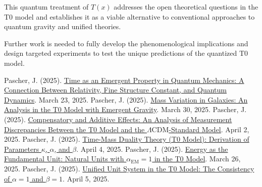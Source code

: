 \documentclass[12pt,a4paper]{article}
\newcommand{\Tfield}{T(x)}
\newcommand{\alphaEM}{\alpha_{\text{EM}}}
\newcommand{\LCDM}{\Lambda\text{CDM}}
\begin{document}
	This quantum treatment of $\Tfield$ addresses the open theoretical questions in the T0 model and establishes it as a viable alternative to conventional approaches to quantum gravity and unified theories.
	
	Further work is needed to fully develop the phenomenological implications and design targeted experiments to test the unique predictions of the quantized T0 model.
	

	
	\begin{thebibliography}{99}
		 Pascher, J. (2025). \href{https://github.com/jpascher/T0-Time-Mass-Duality/tree/main/2/pdf/Deutsch/Zeit\%20als\%20emergente\%20Eigenschaft\%20in\%20der\%20Quantenmechanik_en.pdf}{Time as an Emergent Property in Quantum Mechanics: A Connection Between Relativity, Fine Structure Constant, and Quantum Dynamics}. March 23, 2025.
		 Pascher, J. (2025). \href{https://github.com/jpascher/T0-Time-Mass-Duality/tree/main/2/pdf/Deutsch/Massenvariation\%20in\%20Galaxien_en.pdf}{Mass Variation in Galaxies: An Analysis in the T0 Model with Emergent Gravity}. March 30, 2025.
		 Pascher, J. (2025). \href{https://github.com/jpascher/T0-Time-Mass-Duality/tree/main/2/pdf/Deutsch/Analyse\%20der\%20Messdifferenzen\%20zwischen\%20dem\%20T0-Modell\%20und\%20dem\%20Standardmodell_en.pdf}{Compensatory and Additive Effects: An Analysis of Measurement Discrepancies Between the T0 Model and the \(\LCDM\)-Standard Model}. April 2, 2025.
		 Pascher, J. (2025). \href{https://github.com/jpascher/T0-Time-Mass-Duality/tree/main/2/pdf/Deutsch/Zeit-Masse-Dualit\%C3\%A4tstheorie\%20(T0-Modell)\%20Herleitung\%20der\%20Parameter\%20kappa,\%20alpha\%20und\%20beta_en.pdf}{Time-Mass Duality Theory (T0 Model): Derivation of Parameters \(\kappa\), \(\alpha\), and \(\beta\)}. April 4, 2025.
		 Pascher, J. (2025). \href{https://github.com/jpascher/T0-Time-Mass-Duality/tree/main/2/pdf/Deutsch/Nat\%C3\%BCrliche\%20Einheiten\%20mit\%20Feinstrukturkonstante\%20alpha\%20=\%201_en.pdf}{Energy as the Fundamental Unit: Natural Units with \(\alphaEM = 1\) in the T0 Model}. March 26, 2025.
		 Pascher, J. (2025). \href{https://github.com/jpascher/T0-Time-Mass-Duality/tree/main/2/pdf/Deutsch/Die\%20Konsistenz\%20von\%20alpha\%20=\%201\%20und\%20beta\%20=\%201_en.pdf}{Unified Unit System in the T0 Model: The Consistency of \(\alpha = 1\) and \(\beta = 1\)}. April 5, 2025.

\end{thebibliography}
\end{document}
